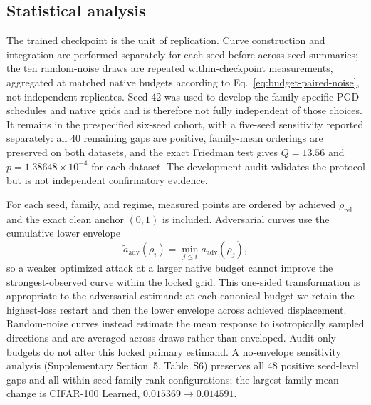 \documentclass[preprint,12pt,authoryear]{elsarticle}
\begin{document}
\subsection{Statistical analysis}
\label{subsec:statistics}

The trained checkpoint is the unit of replication. Curve construction and
integration are performed separately for each seed before across-seed
summaries; the ten random-noise draws are repeated within-checkpoint
measurements, aggregated at matched native budgets according to
Eq.~\eqref{eq:budget-paired-noise}, not independent replicates. Seed 42 was
used to develop the family-specific PGD schedules and native grids and is
therefore not fully independent of those choices. It remains in the
prespecified six-seed cohort, with a five-seed sensitivity reported
separately: all 40 remaining gaps are positive, family-mean orderings are
preserved on both datasets, and the exact Friedman test gives $Q=13.56$ and
$p=1.38648\times10^{-4}$ for each dataset. The development audit validates
the protocol but is not independent confirmatory evidence.

For each seed, family, and regime, measured points are ordered by achieved
$\rho_{\mathrm{rel}}$ and the exact clean anchor $(0,1)$ is included.
Adversarial curves use the cumulative lower envelope
\begin{equation}
\widetilde{a}_{\mathrm{adv}}(\rho_i)
=
\min_{j\leq i} a_{\mathrm{adv}}(\rho_j),
\label{eq:lower-envelope}
\end{equation}
so a weaker optimized attack at a larger native budget cannot improve the
strongest-observed curve within the locked grid. This one-sided
transformation is appropriate to the adversarial estimand: at each canonical
budget we retain the highest-loss restart and then the lower envelope across
achieved displacement. Random-noise curves instead estimate the mean response
to isotropically sampled directions and are averaged across draws rather than
enveloped. Audit-only budgets do not alter this locked primary estimand. A
no-envelope sensitivity analysis (Supplementary Section~5,
Table~S6) preserves all 48 positive seed-level gaps and
all within-seed family rank configurations; the largest family-mean change is
CIFAR-100 Learned, $0.015369\to0.014591$.
\end{document}
